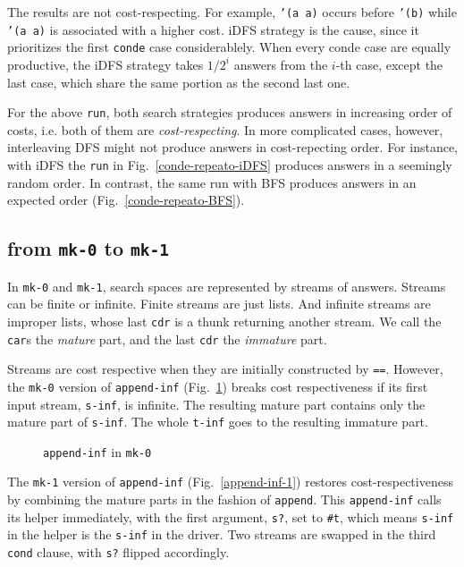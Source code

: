 \documentclass[format=acmlarge, review=true, authordraft=true]{acmart}
\begin{document}
The results are not cost-respecting. For example, \texttt{'(a a)} occurs before
\texttt{'(b)} while \texttt{'(a a)} is associated with a higher cost. 
iDFS strategy is the cause, since it prioritizes the first \texttt{conde} case
considerablely. When every conde case are equally productive, the iDFS
strategy takes $1/2^{i}$ answers from the $i$-th case, except the last case,
which share the same portion as the second last one.


For the above \texttt{run}, both search strategies produces answers in increasing
order of costs, i.e. both of them are \emph{cost-respecting}. In more complicated
cases, however, interleaving DFS might not produce answers in cost-repecting order.
For instance, with iDFS the \texttt{run} in Fig.~\ref{conde-repeato-iDFS} produces
answers in a seemingly random order. In contrast, the same run with BFS produces
answers in an expected order (Fig.~\ref{conde-repeato-BFS}).



\subsection{from \texttt{mk-0} to \texttt{mk-1}}

In \texttt{mk-0} and \texttt{mk-1}, search spaces are represented by streams of answers. Streams can be finite or infinite. Finite streams are just lists. And infinite streams are improper lists, whose last \texttt{cdr} is a thunk returning another stream. We call the \texttt{car}s the \emph{mature} part, and the last \texttt{cdr} the \emph{immature} part. 

Streams are cost respective when they are initially constructed by \texttt{==}. However, the \texttt{mk-0} version of \texttt{append-inf} (Fig.~\ref{append-inf-0}) breaks cost respectiveness if its first input stream, \texttt{s-inf}, is infinite. The resulting mature part contains only the mature part of \texttt{s-inf}. The whole \texttt{t-inf} goes to the resulting immature part.

\begin{figure}
	 	
	 \caption{\texttt{append-inf} in \texttt{mk-0}}
	 \label{append-inf-0}
\end{figure}

The \texttt{mk-1} version of \texttt{append-inf} (Fig.~\ref{append-inf-1}) restores cost-respectiveness by combining the mature parts in the fashion of \texttt{append}. This \texttt{append-inf} calls its helper immediately, with the first argument, \texttt{s?}, set to \texttt{\#{}t}, which means \texttt{s-inf} in the helper is the \texttt{s-inf} in the driver. Two streams are swapped in the third \texttt{cond} clause, with \texttt{s?} flipped accordingly.
\end{document}
